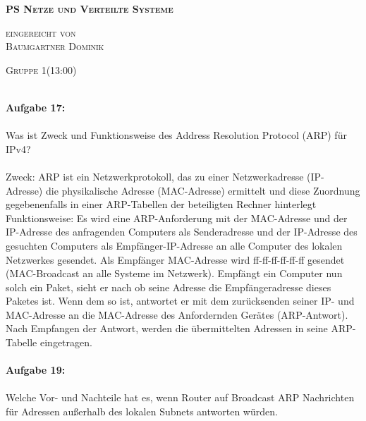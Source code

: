 \documentclass[12pt,a4paper]{report}
\begin{document}

\begin{titlepage}
	\begin{center}
		
		\vspace*{1.0cm}
		\huge
		\textsc{\bf{PS Netze und Verteilte Systeme}}
		
		\vspace*{4.0cm}
		\textsc{
			\normalsize{eingereicht von} \\[0.5\baselineskip]
			{\large Baumgartner Dominik}
		}
		
		\vspace*{3.0cm}
		\textsc{
			\normalsize{Gruppe 1(13:00)}
		}
		
	\end{center}
	
\end{titlepage}

\ \\
\textbf{Aufgabe 17:}
\\
\\
Was ist Zweck und Funktionsweise des Address Resolution Protocol (ARP) für IPv4? 
\\
\\
Zweck: ARP ist ein Netzwerkprotokoll, das zu einer Netzwerkadresse (IP-Adresse) die physikalische Adresse (MAC-Adresse) ermittelt und diese Zuordnung gegebenenfalls in einer ARP-Tabellen der beteiligten Rechner hinterlegt\\
Funktionsweise: Es wird eine ARP-Anforderung mit der MAC-Adresse und der IP-Adresse des anfragenden Computers als Senderadresse und der IP-Adresse des gesuchten Computers als Empfänger-IP-Adresse an alle Computer des lokalen Netzwerkes gesendet. Als Empfänger MAC-Adresse wird ff-ff-ff-ff-ff-ff gesendet (MAC-Broadcast an alle Systeme im Netzwerk). Empfängt ein Computer nun solch ein Paket, sieht er nach ob seine Adresse die Empfängeradresse dieses Paketes ist. Wenn dem so ist, antwortet er mit dem zurücksenden seiner IP- und MAC-Adresse an die MAC-Adresse
des Anfordernden Gerätes (ARP-Antwort). Nach Empfangen der Antwort, werden die übermittelten Adressen in seine ARP-Tabelle eingetragen.\\
\\
\textbf{Aufgabe 19:}
\\
\\
 Welche Vor- und Nachteile hat es, wenn Router auf Broadcast ARP Nachrichten für
 Adressen außerhalb des lokalen Subnets antworten würden.
\\
\\
\end{document}
